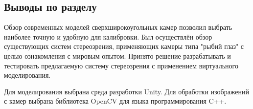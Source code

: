 \subsection{Выводы по разделу}

Обзор современных моделей сверхширокоугольных камер позволил выбрать 
наиболее точную и удобную для калибровки. Был осуществлён обзор существующих
систем стереозрения, применяющих камеры типа "рыбий глаз" с целью ознакомления 
с мировым опытом. Принято решение разрабатывать и тестировать предлагаемую 
систему стереозрения с применением виртуального  моделирования. 

Для моделирования выбрана среда разработки Unity. Для обработки изображений
с камер выбрана библиотека OpenCV для языка программирования C++. 